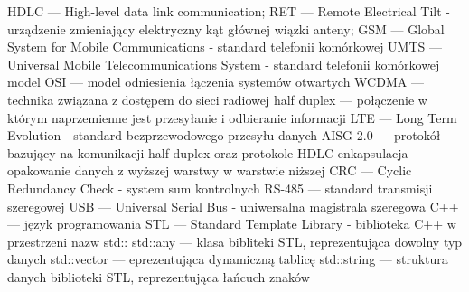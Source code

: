 \cleardoublepage
{}
{}

HDLC --- High-level data link communication;\newline
RET --- Remote Electrical Tilt - urządzenie zmieniający elektryczny kąt głównej wiązki anteny;\newline
GSM --- Global System for Mobile Communications - standard telefonii komórkowej\newline
UMTS --- Universal Mobile Telecommunications System - standard telefonii komórkowej\newline
model OSI --- model odniesienia łączenia systemów otwartych\newline
WCDMA --- technika związana z dostępem do sieci radiowej\newline
half duplex --- połączenie w którym naprzemienne jest przesyłanie i odbieranie informacji\newline
LTE --- Long Term Evolution - standard bezprzewodowego przesyłu danych\newline
AISG 2.0 --- protokół bazujący na komunikacji half duplex oraz protokole HDLC\newline
enkapsulacja --- opakowanie danych z wyższej warstwy w warstwie niższej\newline
CRC --- Cyclic Redundancy Check - system sum kontrolnych\newline
RS-485 --- standard transmisji szeregowej\newline
USB --- Universal Serial Bus - uniwersalna magistrala szeregowa\newline
C++ --- język programowania\newline
STL --- Standard Template Library - biblioteka C++ w przestrzeni nazw std::\newline
std::any --- klasa bibliteki STL, reprezentująca dowolny typ danych\newline
std::vector --- eprezentująca dynamiczną tablicę\newline
std::string --- struktura danych biblioteki STL, reprezentująca łańcuch znaków\newline
